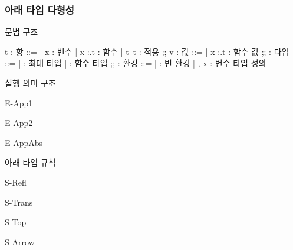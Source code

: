 \documentclass{beamer}
\begin{document}
\begin{frame}[c, fragile]
  \frametitle{아래 타입 다형성}

  \tiny
  \begin{minipage}[t]{0.49\linewidth}
    문법 구조
    \begin{center}
      \def\typecolon{{:}}
      \begin{bnf}
        t : 항 ::=
        | x : 변수
        | \lambda x \typecolon \tau.t : 함수
        | t\ t : 적용
        ;;
        v : 값 ::=
        | \lambda x \typecolon \tau .t : 함수 값
        ;;
        \tau : 타입 ::=
        | \top : 최대 타입
        | \tau \to \tau : 함수 타입
        ;;
        \Gamma : 환경 ::=
        | \varnothing : 빈 환경
        | \Gamma, x \mathrel{\typecolon} \tau : 변수 타입 정의
      \end{bnf}
    \end{center}
    실행 의미 구조\hfill{}
    \begin{center}
      \begin{InfRule}{E-App1}
      \end{InfRule}
      \begin{InfRule}{E-App2}
      \end{InfRule}
      \begin{InfRule}{E-AppAbs}
      \end{InfRule}
    \end{center}
  \end{minipage}
  \begin{minipage}[t]{0.49\linewidth}
    아래 타입 규칙\hfill\fbox{$\varsigma <: \tau$}
    \begin{center}
      \begin{InfRule}{S-Refl}
      \end{InfRule}
      \begin{InfRule}{S-Trans}
        \hypo{\varsigma <: \upsilon}
        \hypo{\upsilon <: \tau}
      \end{InfRule}
      \begin{InfRule}{S-Top}
      \end{InfRule}
      \begin{InfRule}{S-Arrow}

\end{InfRule}
\end{center}
\end{minipage}
\end{frame}
\end{document}
